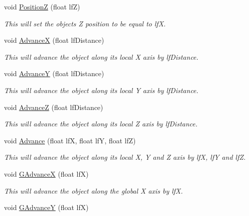 \begin{DoxyCompactItemize}
void \hyperlink{classc_matrix4_a6baf253feb5e27b5e3e81971d9f5d718}{PositionZ} (float lfZ)
\begin{DoxyCompactList}\small\item\em This will set the objects Z position to be equal to lfX. \item\end{DoxyCompactList}\item 
void \hyperlink{classc_matrix4_aa23f7d55e4eddcba673f8a6e44f63c3e}{AdvanceX} (float lfDistance)
\begin{DoxyCompactList}\small\item\em This will advance the object along its local X axis by lfDistance. \item\end{DoxyCompactList}\item 
void \hyperlink{classc_matrix4_ae28d0f2cfe996ec5422cdaec98f30c9a}{AdvanceY} (float lfDistance)
\begin{DoxyCompactList}\small\item\em This will advance the object along its local Y axis by lfDistance. \item\end{DoxyCompactList}\item 
void \hyperlink{classc_matrix4_a31d0d26e3b91628365871ad10dc33f8e}{AdvanceZ} (float lfDistance)
\begin{DoxyCompactList}\small\item\em This will advance the object along its local Z axis by lfDistance. \item\end{DoxyCompactList}\item 
void \hyperlink{classc_matrix4_a00d27c2daab0e05c403c8fb86445fb81}{Advance} (float lfX, float lfY, float lfZ)
\begin{DoxyCompactList}\small\item\em This will advance the object along its local X, Y and Z axis by lfX, lfY and lfZ. \item\end{DoxyCompactList}\item 
void \hyperlink{classc_matrix4_a6796b615c465903d48fe0c8094b1f7c1}{GAdvanceX} (float lfX)
\begin{DoxyCompactList}\small\item\em This will advance the object along the global X axis by lfX. \item\end{DoxyCompactList}\item 
void \hyperlink{classc_matrix4_af4453f95ef875b0c5002d72bade65bb1}{GAdvanceY} (float lfX)

\end{DoxyCompactItemize}
